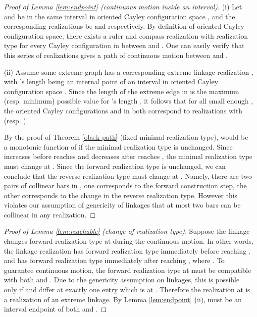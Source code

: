 \documentclass[secthm,amsthm,english]{article}
\theoremstyle{definition}
\theoremstyle{remark}
\begin{document}
\begin{proof}[Proof of Lemma \ref{lem:endpoint} (continuous motion inside an interval)]
\noindent (i) 
Let  and  be in the same interval  in oriented Cayley configuration space , and the corresponding realizations be  and  respectively. 
By definition of oriented Cayley configuration space,  
there exists a ruler and compass realization with realization type  for
every Cayley configuration in  between  and .
One can easily verify that this series of realizations gives a path of continuous motion between  and . 


\noindent (ii) Assume some extreme graph  has a corresponding extreme linkage realization , 
with 's length  being an internal point of an interval  in oriented Cayley configuration space .
Since the length  of the extreme edge  in  is the maximum (resp. minimum) possible value for 's length , 
it follows that for all small enough , the oriented Cayley configurations  and  in  both correspond to realizations with  (resp. ). 

By the proof of Theorem \ref{obs:k-path} (fixed minimal realization type),   would be a monotonic function of  if the minimal realization type is unchanged.
Since  increases before  reaches  and decreases after  reaches , 
the minimal realization type must change at . 
Since the forward realization type is unchanged, 
we can conclude that the reverse realization type must change at . 
Namely, there are two pairs of collinear bars in , 
one corresponds to the  forward construction step, the other corresponds to the change in the reverse realization type. 
However this violates our assumption of genericity of linkages that  at most two bars can be collinear in any realization. 
\end{proof}

\begin{proof}[Proof of Lemma \ref{lem:reachable} (change of realization type)]
Suppose the linkage changes forward realization type at  during the continuous motion. 
In other words, the linkage realization has forward realization type  immediately before reaching ,
and has forward realization type  immediately after reaching , where . 
To guarantee continuous motion, the forward realization type at  must be compatible with both  and . 
Due to the genericity assumption on linkages, 
this is possible only if  and  differ at exactly one entry which is  at . 
Therefore the realization at  is a realization of an extreme linkage. 
By Lemma \ref{lem:endpoint} (ii),  must be an interval endpoint of both  and .
\end{proof}
\end{document}
